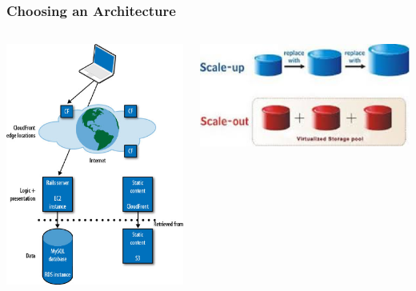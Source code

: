 \documentclass{beamer}
\begin{document}
\begin{frame}
\frametitle{Choosing an Architecture}

\begin{columns}

\begin{center}
\includegraphics[scale=0.20]{Programming_Amazon_EC2-013.eps}      
\end{center}
\begin{center}
\includegraphics[scale=0.45]{scale.eps}
\end{center}
\end{columns}


\end{frame}
\end{document}
